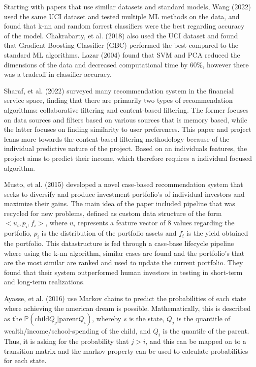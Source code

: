 \documentclass{article}
\begin{document}
Starting with papers that use similar datasets and standard models, Wang (2022) \cite{wang} used the same UCI dataset and tested multiple ML methods on the data, and found that k-nn and random forrest classifiers were the best regarding accuracy of the model. Chakrabarty, et al. (2018) \cite{chakrabarty} also used the UCI dataset and found that Gradient Boosting Classifier (GBC) performed the best compared to the standard ML algorithms. Lazar (2004) \cite{lazar} found that SVM and PCA reduced the dimensions of the data and decreased computational time by 60\%, however there was a tradeoff in classifier accuracy.

Sharaf, et al. (2022) \cite{sharaf} surveyed many recommendation system in the financial service space, finding that there are primarily two types of recommendation algorithms: collaborative filtering and content-based filtering. The former focuses on data sources and filters based on various sources that is memory based, while the latter focuses on finding similarity to user preferences. This paper and project leans more towards the content-based filtering methodology because of the individual predictive nature of the project. Based on an individuals features, the project aims to predict their income, which therefore requires a individual focused algorithm. 

Musto, et al. (2015) \cite{musto} developed a novel case-based recommendation system that seeks to diversify and produce investment portfolio's of individual investors and maximize their gains. The main idea of the paper included pipeline that was recycled for new problems, defined as custom data structure of the form $<u_i, p_i, f_i>$, where $u_i$ represents a feature vector of 8 values regarding the portfolio, $p_i$ is the distribution of the portfolio assets and $f_i$ is the yield obtained the portfolio. This datastructure is fed through a case-base lifecycle pipeline where using the k-nn algorithm, similar cases are found and the portfolio's that are the most similar are ranked and used to update the current portfolio. They found that their system outperformed human investors in testing in short-term and long-term realizations. 

Ayasse, et al. (2016) \cite{ayasse} use Markov chains to predict the probabilities of each state where achieving the american dream is possible. Mathematically, this is described as the $\mathbb{P}(\text{child}Q_j | \text{parent}Q_i)$, whereby $s$ is the state, $Q_j$ is the quantitle of wealth/income/school-spending of the child, and $Q_i$ is the quantile of the parent. Thus, it is asking for the probability that $j > i$, and this can be mapped on to a transition matrix and the markov property can be used to calculate probabilities for each state.
\end{document}
